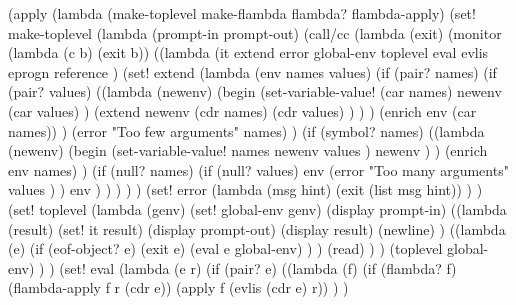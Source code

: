 \begin{code:lisp}
(apply
 (lambda (make-toplevel make-flambda flambda? flambda-apply)
   (set! make-toplevel
     (lambda (prompt-in prompt-out)
       (call/cc
        (lambda (exit)
          (monitor (lambda (c b) (exit b))
            ((lambda (it extend error global-env toplevel
                      eval evlis eprogn reference )
               (set! extend
                     (lambda (env names values)
                       (if (pair? names)
                           (if (pair? values)
                               ((lambda (newenv)
                                  (begin
                                   (set-variable-value!
                                    (car names) newenv (car values) )
                                   (extend newenv (cdr names)
                                           (cdr values) ) ) )
                                (enrich env (car names)) )
                               (error "Too few arguments" names) )
                           (if (symbol? names)
                               ((lambda (newenv)
                                  (begin
                                   (set-variable-value!
                                    names newenv values )
                                   newenv ) )
                                (enrich env names) )
                               (if (null? names)
                                   (if (null? values) env
                                       (error "Too many arguments"
                                              values ) )
                                   env ) ) ) ) )
               (set! error
                     (lambda (msg hint)
                       (exit (list msg hint)) ) )
               (set! toplevel
                     (lambda (genv)
                       (set! global-env genv)
                       (display prompt-in)
                       ((lambda (result)
                          (set! it result)
                          (display prompt-out)
                          (display result) (newline) )
                        ((lambda (e)
                           (if (eof-object? e) (exit e)
                               (eval e global-env) ) )
                         (read) ) )
                       (toplevel global-env) ) )
               (set! eval
                     (lambda (e r)
                       (if (pair? e)
                           ((lambda (f)
                              (if (flambda? f)
                                  (flambda-apply f r (cdr e))
                                  (apply f (evlis (cdr e) r)) ) )

\end{code:lisp}
